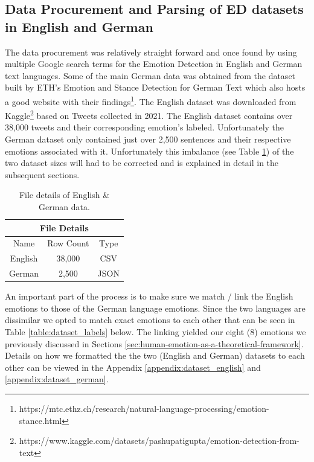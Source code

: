 \documentclass[11pt]{article}
\begin{document}
\subsection{Data Procurement and Parsing of ED datasets in English and German}
\label{sec:data-procurement-process}
The data procurement was relatively straight forward and once found by using multiple Google search terms for the Emotion Detection in English and German text languages. Some of the main German data was obtained from the dataset built by ETH's Emotion and Stance Detection for German Text \cite{mascarell-etal-2021-stance} which also hosts a good website with their findings\footnote{https://mtc.ethz.ch/research/natural-language-processing/emotion-stance.html}. The English dataset was downloaded from Kaggle\footnote{https://www.kaggle.com/datasets/pashupatigupta/emotion-detection-from-text} based on Tweets collected in 2021. The English dataset contains over 38,000 tweets and their corresponding emotion's labeled. Unfortunately the German dataset only contained just over 2,500 sentences and their respective emotions associated with it. Unfortunately this imbalance (see Table \ref{table:file-details}) of the two dataset sizes will had to be corrected and is explained in detail in the subsequent sections.

\begin{table}[h!]
\centering
\begin{tabular}{ | c | c | c | }
    \hline
    \multicolumn{3}{|c|}{File Details} \\
    \hline
    Name & Row Count & Type \\
    \hline
    English & 38,000 & CSV  \\
    German  &  2,500 & JSON \\
    \hline
\end{tabular}
\caption{File details of English \& German data.}
\label{table:file-details}
\end{table}

An important part of the process is to make sure we match / link the English emotions to those of the German language emotions. Since the two languages are dissimilar we opted to match exact emotions to each other that can be seen in Table \ref{table:dataset_labels} below. The linking yielded our eight (8) emotions we previously discussed in Sections \ref{sec:human-emotion-as-a-theoretical-framework}. Details on how we formatted the the two (English and German) datasets to each other can be viewed in the Appendix \ref{appendix:dataset_english} and \ref{appendix:dataset_german}.
\end{document}
